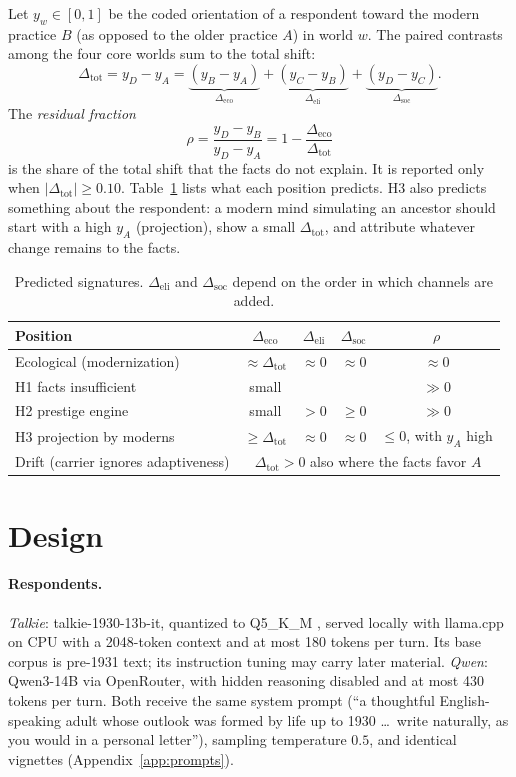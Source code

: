\documentclass[11pt]{article}
\newcommand{\eco}{\Delta_{\mathrm{eco}}}
\newcommand{\eli}{\Delta_{\mathrm{eli}}}
\newcommand{\soc}{\Delta_{\mathrm{soc}}}
\newcommand{\tot}{\Delta_{\mathrm{tot}}}
\begin{document}
Let $y_w\in[0,1]$ be the coded orientation of a respondent toward the modern practice $B$ (as opposed to the older practice $A$) in world $w$.
The paired contrasts among the four core worlds sum to the total shift:
\begin{equation}
\tot = y_D-y_A = \underbrace{(y_B-y_A)}_{\eco}+\underbrace{(y_C-y_B)}_{\eli}+\underbrace{(y_D-y_C)}_{\soc}.
\end{equation}
The \emph{residual fraction}
\begin{equation}
\rho = \frac{y_D-y_B}{y_D-y_A}=1-\frac{\eco}{\tot}
\end{equation}
is the share of the total shift that the facts do not explain.
It is reported only when $|\tot|\ge 0.10$.
Table~\ref{tab:predictions} lists what each position predicts.
H3 also predicts something about the respondent: a modern mind simulating an ancestor should start with a high $y_A$ (projection), show a small $\tot$, and attribute whatever change remains to the facts.

\begin{table}[h]
\centering\small
\begin{tabular}{lcccc}
\toprule
Position & $\eco$ & $\eli$ & $\soc$ & $\rho$ \\
\midrule
Ecological (modernization) & $\approx\tot$ & $\approx0$ & $\approx0$ & $\approx 0$ \\
H1 facts insufficient & small & & & $\gg 0$ \\
H2 prestige engine & small & $>0$ & $\ge 0$ & $\gg 0$ \\
H3 projection by moderns & $\ge\tot$ & $\approx0$ & $\approx0$ & $\le 0$, with $y_A$ high \\
Drift (carrier ignores adaptiveness) & \multicolumn{4}{c}{$\tot>0$ also where the facts favor $A$} \\
\bottomrule
\end{tabular}
\caption{Predicted signatures. $\eli$ and $\soc$ depend on the order in which channels are added.}
\label{tab:predictions}
\end{table}

\section{Design}

\paragraph{Respondents.}
\emph{Talkie}: talkie-1930-13b-it, quantized to Q5\_K\_M \cite{talkie2026gguf}, served locally with llama.cpp on CPU with a 2048-token context and at most 180 tokens per turn.
Its base corpus is pre-1931 text; its instruction tuning may carry later material.
\emph{Qwen}: Qwen3-14B \cite{yang2025qwen3} via OpenRouter, with hidden reasoning disabled and at most 430 tokens per turn.
Both receive the same system prompt (``a thoughtful English-speaking adult whose outlook was formed by life up to 1930 \ldots\ write naturally, as you would in a personal letter''), sampling temperature $0.5$, and identical vignettes (Appendix~\ref{app:prompts}).
\end{document}
